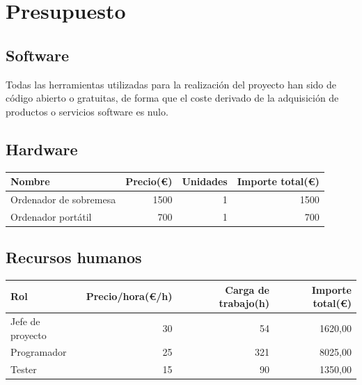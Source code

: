 			\FloatBarrier

	\section{Presupuesto}

		\subsection{Software}

			Todas las herramientas utilizadas para la realización del proyecto han sido de código abierto o gratuitas, de forma que el coste derivado de la adquisición de productos o servicios software es nulo.

		\subsection{Hardware}

			\begin{center}
				\begin{tabular}{| l | r | r | r |}
					\hline
					Nombre				&	Precio(\euro)	&	Unidades	&	Importe total(\euro)	\\	\hline
					Ordenador de sobremesa			& 	1500			&	1 			&	1500					\\	\hline
					Ordenador portátil	&	700				&	1			&	700						\\
					\hline
				\end{tabular}
			\end{center}

		\subsection{Recursos humanos}

			\begin{center}
				\begin{tabular}{| l | r | r | r |}
					\hline
					Rol					&	Precio/hora(\euro/h)	&	Carga de trabajo(h)	&	Importe total(\euro)	\\	\hline
					Jefe de proyecto	& 	30						&	54 					& 	1620,00				\\	\hline
					Programador			&	25						&	321					&	8025,00			\\	\hline
					Tester			&	15						&	90					&	1350,00				\\	\hline
				\end{tabular}
			\end{center}

